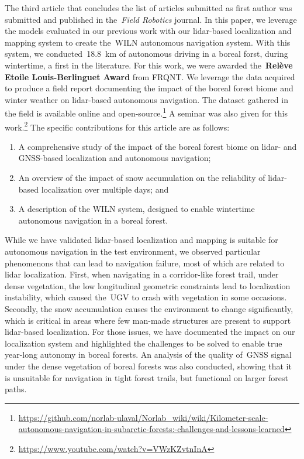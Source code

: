 \documentclass[12pt,letterpaper,oneside]{article}
\begin{document}
The third article that concludes the list of articles submitted as first author was submitted and published in the~\emph{Field Robotics} journal.
In this paper, we leverage the models evaluated in our previous work with our lidar-based localization and mapping system to create the~\ac{WILN} autonomous navigation system. 
With this system, we conducted~\SI{18.8}{\kilo\meter} of autonomous driving in a boreal forst, during wintertime, a first in the literature.
For this work, we were awarded the~\textbf{Relève Etoile Louis-Berlinguet Award} from FRQNT.
We leverage the data acquired to produce a field report documenting the impact of the boreal forest biome and winter weather on lidar-based autonomous navigation.
The dataset gathered in the field is available online and open-source.\footnote{\textwidth\url{https://github.com/norlab-ulaval/Norlab_wiki/wiki/Kilometer-scale-autonomous-navigation-in-subarctic-forests:-challenges-and-lessons-learned}}
A seminar was also given for this work.\footnote{\url{https://www.youtube.com/watch?v=VWzKZvtnInA}}
The specific contributions for this article are as follows:
\begin{enumerate}
	\item A comprehensive study of the impact of the boreal forest biome on lidar- and \ac{GNSS}-based localization and autonomous navigation;  
	\item An overview of the impact of snow accumulation on the reliability of lidar-based localization over multiple days; and
	\item A description of the \ac{WILN} system, designed to enable wintertime autonomous navigation in a boreal forest.
\end{enumerate}
While we have validated lidar-based localization and mapping is suitable for autonomous navigation in the test environment, we observed particular phenomenons that can lead to navigation failure, most of which are related to lidar localization.
First, when navigating in a corridor-like forest trail, under dense vegetation, the low longitudinal geometric constraints lead to localization instability, which caused the~\ac{UGV} to crash with vegetation in some occasions.
Secondly, the snow accumulation causes the environment to change significantly, which is critical in areas where few man-made structures are present to support lidar-based localization.
For those issues, we have documented the impact on our localization system and highlighted the challenges to be solved to enable true year-long autonomy in boreal forests.
An analysis of the quality of~\ac{GNSS} signal under the dense vegetation of boreal forests was also conducted, showing that it is unsuitable for navigation in tight forest trails, but functional on larger forest paths.
\end{document}
